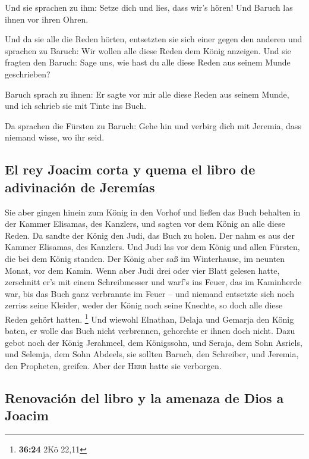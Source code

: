  Und sie sprachen zu ihm: Setze dich und lies, dass wir's
hören! Und Baruch las ihnen vor ihren Ohren.

 Und da sie alle die Reden hörten, entsetzten sie sich
einer gegen den anderen und sprachen zu Baruch: Wir wollen alle diese
Reden dem König anzeigen.  Und sie fragten den Baruch:
Sage uns, wie hast du alle diese Reden aus seinem Munde geschrieben?

 Baruch sprach zu ihnen: Er sagte vor mir alle diese
Reden aus seinem Munde, und ich schrieb sie mit Tinte ins Buch.

 Da sprachen die Fürsten zu Baruch: Gehe hin und verbirg
dich mit Jeremia, dass niemand wisse, wo ihr seid.

\hypertarget{el-rey-joacim-corta-y-quema-el-libro-de-adivinaciuxf3n-de-jeremuxedas}{%
\subsection{El rey Joacim corta y quema el libro de adivinación de
Jeremías}\label{el-rey-joacim-corta-y-quema-el-libro-de-adivinaciuxf3n-de-jeremuxedas}}

 Sie aber gingen hinein zum König in den Vorhof und
ließen das Buch behalten in der Kammer Elisamas, des Kanzlers, und
sagten vor dem König an alle diese Reden.  Da sandte der
König den Judi, das Buch zu holen. Der nahm es aus der Kammer Elisamas,
des Kanzlers. Und Judi las vor dem König und allen Fürsten, die bei dem
König standen.  Der König aber saß im Winterhause, im
neunten Monat, vor dem Kamin.  Wenn aber Judi drei oder
vier Blatt gelesen hatte, zerschnitt er's mit einem Schreibmesser und
warf's ins Feuer, das im Kaminherde war, bis das Buch ganz verbrannte im
Feuer --  und niemand entsetzte sich noch zerriss seine
Kleider, weder der König noch seine Knechte, so doch alle diese Reden
gehört hatten. \footnote{\textbf{36:24} 2Kö 22,11}  Und
wiewohl Elnathan, Delaja und Gemarja den König baten, er wolle das Buch
nicht verbrennen, gehorchte er ihnen doch nicht.  Dazu
gebot noch der König Jerahmeel, dem Königssohn, und Seraja, dem Sohn
Asriels, und Selemja, dem Sohn Abdeels, sie sollten Baruch, den
Schreiber, und Jeremia, den Propheten, greifen. Aber der \textsc{Herr}
hatte sie verborgen.

\hypertarget{renovaciuxf3n-del-libro-y-la-amenaza-de-dios-a-joacim}{%
\subsection{Renovación del libro y la amenaza de Dios a
Joacim}\label{renovaciuxf3n-del-libro-y-la-amenaza-de-dios-a-joacim}}


